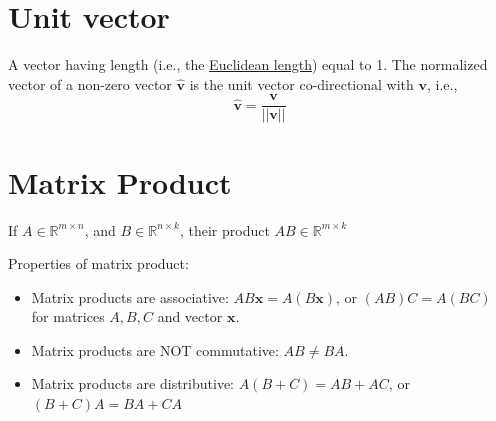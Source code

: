 \documentclass[conference,final,11pt,technote,onecolumn]{IEEEtran}\usepackage[]{graphicx}\usepackage[]{color}
\begin{document}
	\section{Unit vector}
	\label{term:unit_vector}
A vector having length (i.e., the \hyperref[term:dot_product]{Euclidean length}) equal to 1.
The normalized vector of a non-zero vector $\hat{\mathbf{v}}$ is the unit vector co-directional with $\mathbf{v}$, i.e.,
\[ \hat{\mathbf{v}} = \dfrac{\mathbf{v}}{||\mathbf{v}||} \]

	\section{Matrix Product}
	\label{term:matrix_product}
If $A\in \mathbb{R}^{m\times n}$, and $B\in \mathbb{R}^{n\times k}$, their product $AB\in \mathbb{R}^{m\times k}$

Properties of matrix product:
\begin{itemize}
\item Matrix products are associative: $AB\mathbf{x} = A(B\mathbf{x})$, or $(AB)C = A(BC)$ for matrices $A,B,C$ and vector $\mathbf{x}$.
\item Matrix products are NOT commutative: $AB \neq BA$.
\item Matrix products are distributive: $A(B+C) = AB + AC$, or $(B+C)A = BA + CA$
\end{itemize}
\end{document}
